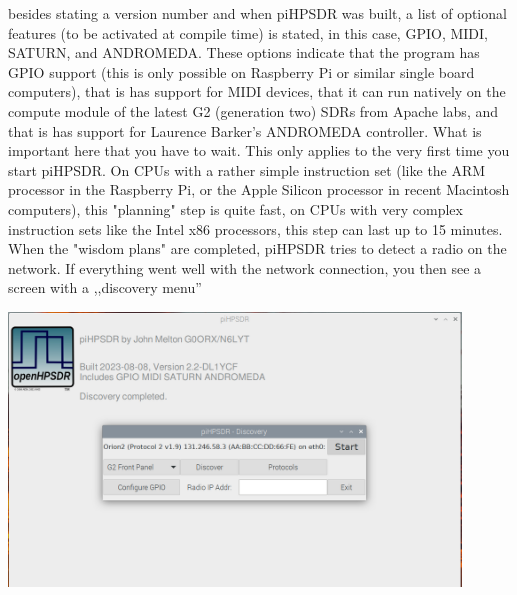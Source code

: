 \documentclass[12pt]{book}
\begin{document}
besides stating a version number and when piHPSDR was built, a list of optional features (to be activated
at compile time) is stated, in this case, GPIO, MIDI, SATURN, and ANDROMEDA. These options indicate
that the program has GPIO support (this is only possible on Raspberry Pi or similar single board computers),
that is has support for MIDI devices, that it can run natively on the compute module of the latest
G2 (generation two) SDRs from Apache labs, and that is has support for Laurence Barker's ANDROMEDA controller.
What is important here that you have to wait. This only applies to the very first time you start piHPSDR.
On CPUs with a rather simple instruction set (like the ARM processor in the Raspberry Pi, or the Apple
Silicon processor in recent Macintosh computers), this "planning" step is quite fast, on CPUs with very
complex instruction sets like the Intel x86 processors, this step can last up to 15 minutes. When the
"wisdom plans" are completed, piHPSDR tries to detect a radio on the network. If everything went well with
the network connection, you then see a screen with a ,,discovery menu''

\begin{center}
\includegraphics[width=12cm]{Start.png}
\end{center}
\end{document}
